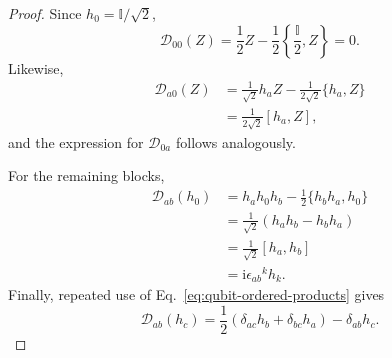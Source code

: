 \documentclass[10pt,a4paper]{amsart}
\begin{document}
\begin{proof}
Since \(h_0=\mathbb I/\sqrt2\),
\[
\mathcal D_{00}(Z)
=
\frac12Z
-
\frac12
\left\{
\frac{\mathbb I}{2},Z
\right\}
=
0.
\]
Likewise,
\begin{align*}
\mathcal D_{a0}(Z)
&=
\frac1{\sqrt2}h_aZ
-
\frac1{2\sqrt2}
\{h_a,Z\}
\\
&=
\frac1{2\sqrt2}
[h_a,Z],
\end{align*}
and the expression for \(\mathcal D_{0a}\) follows analogously.

For the remaining blocks,
\begin{align*}
\mathcal D_{ab}(h_0)
&=
h_ah_0h_b
-
\frac12\{h_bh_a,h_0\}
\\
&=
\frac1{\sqrt2}
(h_ah_b-h_bh_a)
\\
&=
\frac1{\sqrt2}[h_a,h_b]
\\
&=
\mathrm{i}\epsilon_{ab}{}^k h_k.
\end{align*}
Finally, repeated use of
Eq.~\eqref{eq:qubit-ordered-products} gives
\[
\mathcal D_{ab}(h_c)
=
\frac12
\left(
\delta_{ac}h_b
+
\delta_{bc}h_a
\right)
-
\delta_{ab}h_c.
\]
\end{proof}
\end{document}
